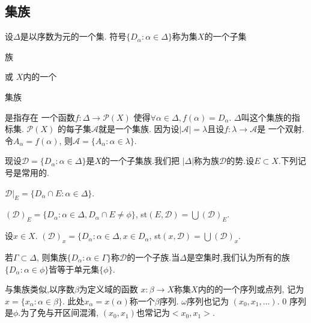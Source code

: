 \documentclass[main.tex]{subfiles}
\begin{document}
\subsection{集族}\label{ch1.1.1}
设$\Delta$是以序数为元的一个集.
符号$\{D_\alpha : \alpha\in\Delta\}$称为集$X$的一个子集\begin{kaishu}族\end{kaishu}或
$X$内的一个\begin{kaishu}集族\end{kaishu}是指存在
一个函数$f:\Delta \to \mathscr{P}(X)$
使得$\forall \alpha \in \Delta, f(\alpha)=D_\alpha$.
$\Delta$叫这个集族的指标集. $\mathscr{P}(X)$
的每子集$\mathscr{A}$就是一个集族.
因为设$|\mathscr{A}|=\lambda$且设$f: \lambda\to \mathscr{A}$是
一个双射.令$A_\alpha = f(\alpha)$, 则$\mathscr{A}=\{A_\alpha:\alpha\in\lambda\}$.

现设$\mathscr{D}=\{D_\alpha:\alpha\in\Delta\}$是$X$的一个子集族.我们把
$|\Delta|$称为族$\mathscr{D}$的势.设$E\subset X$.下列记号是常用的.

$\mathscr{D}|_E= \{D_\alpha\cap E: \alpha\in\Delta\}$.

$(\mathscr{D})_E= \{D_\alpha: \alpha\in\Delta, D_\alpha\cap E \ne\phi\}$,
st$(E, \mathscr{D}) = \bigcup(\mathscr{D})_E$.

设$x\in X$. $(\mathscr{D})_x= \{D_\alpha: \alpha\in\Delta, x\in D_\alpha$,
st$(x, \mathscr{D}) = \bigcup(\mathscr{D})_x$.

若$\Gamma\subset\Delta$, 则集族$\{D_\alpha : \alpha\in\Gamma\}$称$\mathscr{D}$的一个子族.当$\Delta$是空集时,我们认为所有的族$\{D_\alpha : \alpha\in\phi\}$皆等于单元集$\{\phi\}$.

与集族类似,以序数$\beta$为定义域的函数
$x: \beta\to X$称集$X$内的的一个序列或点列, 记为$x=\{x_\alpha : \alpha\in\beta\}$.
此处$x_\alpha=x(\alpha)$称一个$\beta$序列. $\omega$序列也记为
$(x_0, x_1, \dots)$. 0 序列是$\phi$.为了免与开区间混淆, $(x_0, x_1)$也常记为$<x_0, x_1>$.

\end{document}
